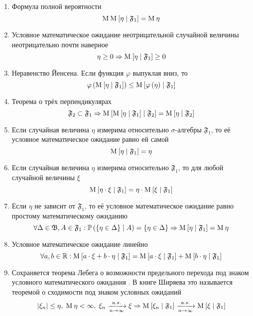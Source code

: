 \begin{enumerate}[label= \Roman*]
  \item\label{conditionalExpectationProperty:totalProbability}
      Формула полной вероятности \cite[стр.~144]{BorovkovMS}
      $$\operatorname{M}_{} \operatorname{M}_{} \left[  \eta \;\middle|\; \mathfrak{F}_1  \right] = \operatorname{M}_{} \eta$$
  \item Условное математическое ожидание неотрицательной случайной величины
      неотрицательно почти наверное
      $$\eta \ge 0
      \Rightarrow \operatorname{M}_{} \left[  \eta \;\middle|\; \mathfrak{F}_1  \right] \ge 0$$
  \item\label{conditionalExpectationProperty:Jensen}
      Неравенство Йенсена. Если функция $\varphi$ выпуклая вниз, то
      $$\varphi\left( \operatorname{M}_{} \left[  \eta \;\middle|\; \mathfrak{F}_1  \right] \right)
      \le \operatorname{M}_{} \left[ \varphi\left( \eta \right) \;\middle|\; \mathfrak{F}_1 \right]$$
  \item Теорема о трёх перпендикулярах
      $$\mathfrak{F}_2 \subset \mathfrak{F}_1 \Rightarrow
      \operatorname{M}_{} \left[  \operatorname{M}_{} \left[ \eta \;\middle|\; \mathfrak{F}_1 \right] \;\middle|\; \mathfrak{F}_2 \right]
      = \operatorname{M}_{} \left[  \eta \;\middle|\; \mathfrak{F}_2  \right]$$
  \item\label{conditionalExpectationProperty:measurableRandomVariable}
      Если случайная величина $\eta$ измерима
      относительно $\sigma$-алгебры $\mathfrak{F}_1$,
      то её условное математическое ожидание равно ей самой
      $$\operatorname{M}_{} \left[  \eta \;\middle|\; \mathfrak{F}_1  \right] = \eta$$
  \item\label{conditionalExpectationProperty:measurableProduct}
      Если случайная величина $\eta$ измерима
      относительно $\mathfrak{F}_1$, то для любой случайной величины $\xi$
      $$\operatorname{M}_{} \left[  \eta \cdot \xi \;\middle|\; \mathfrak{F}_1  \right]
      = \eta \cdot \operatorname{M}_{} \left[  \xi \;\middle|\; \mathfrak{F}_1  \right]$$
  \item\label{conditionalExpectationProperty:independence}
      Если $\eta$ не зависит от $\mathfrak{F}_1$,
      то её условное математическое ожидание
      равно простому математическому ожиданию
      $$\forall \Delta \in \mathfrak{B}, A \in \mathfrak{F}_1:
      \mathbb{P}\left(  \left\{ \eta \in \Delta \right\} \;\middle|\; A \right)
      = \left\{ \eta \in \Delta \right\}
      \Rightarrow \operatorname{M}_{} \left[  \eta \;\middle|\; \mathfrak{F}_1  \right]
      = \operatorname{M}_{} \eta$$
  \item\label{conditionalExpectationProperty:linearity}
      Условное математическое ожидание линейно
      $$\forall a, b \in \mathbb{R}:
      \operatorname{M}_{} \left[ a \cdot \xi + b \cdot \eta \;\middle|\; \mathfrak{F}_1 \right]
      = \operatorname{M}_{} \left[ a \cdot \xi \;\middle|\; \mathfrak{F}_1 \right]
    + \operatorname{M}_{} \left[ b \cdot \eta \;\middle|\; \mathfrak{F}_1 \right]$$
  \item Сохраняется теорема Лебега о возможности предельного перехода
      под знаком условного математического ожидания
      \cite[стр.~302]{KolmogorovFA}.
      В книге Ширяева это называется теоремой о сходимости
      под знаком условных ожиданий \cite[стр.~272]{Shiryayev1}
      $$\left|\xi_n\right| \le \eta,
      \;\operatorname{M}_{} \eta < \infty,
      \;\xi_n \xrightarrow[n\to\infty]{a.s.} \xi
      \Rightarrow
      \operatorname{M}_{} \left[ \xi_n \;\middle|\; \mathfrak{F}_1 \right]
      \xrightarrow[n\to\infty]{a.s.} \operatorname{M}_{} \left[ \xi \;\middle|\; \mathfrak{F}_1 \right]$$
\end{enumerate}

